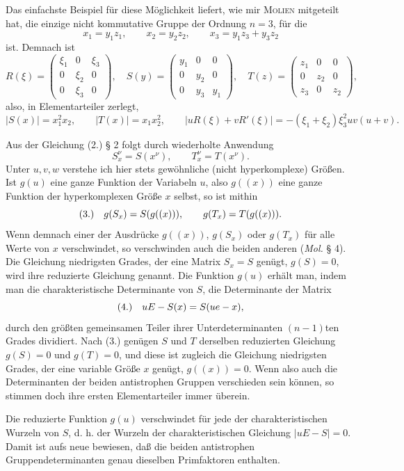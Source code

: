 \documentclass[11pt]{article}
\newcommand{\fnum}[1]{\textup{(\ensuremath{#1}.)}\quad}
\begin{document}
Das einfachste Beispiel für diese Möglichkeit liefert, wie mir \textsc{Molien} mitgeteilt hat, die einzige nicht kommutative Gruppe der Ordnung $n=3$, für die
\[
 x_1=y_1z_1,\qquad x_2=y_2z_2,\qquad x_3=y_1z_3+y_3z_2
\]
ist. Demnach ist
\[
 R(\xi)=
 \begin{pmatrix}\xi_1&0&\xi_3\\0&\xi_2&0\\0&\xi_3&0\end{pmatrix},\quad
 S(y)=
 \begin{pmatrix}y_1&0&0\\0&y_2&0\\0&y_3&y_1\end{pmatrix},\quad
 T(z)=
 \begin{pmatrix}z_1&0&0\\0&z_2&0\\z_3&0&z_2\end{pmatrix},
\]
also, in Elementarteiler zerlegt,
\[
 |S(x)|=x_1^2x_2,\qquad |T(x)|=x_1x_2^2,\qquad
 |uR(\xi)+vR'(\xi)|=-(\xi_1+\xi_2)\xi_3^2uv(u+v).
\]

Aus der Gleichung (2.) § 2 folgt durch wiederholte Anwendung
\[
 S_x^\nu=S(x^\nu),\qquad T_x^\nu=T(x^\nu).
\]
Unter $u,v,w$ verstehe ich hier stets gewöhnliche (nicht hyperkomplexe) Größen. Ist $g(u)$ eine ganze Funktion der Variabeln $u$, also $g((x))$ eine ganze Funktion der hyperkomplexen Größe $x$ selbst, so ist mithin
\[
\fnum{3} g(S_x)=S(g((x))),\qquad g(T_x)=T(g((x))).
\]
Wenn demnach einer der Ausdrücke $g((x))$, $g(S_x)$ oder $g(T_x)$ für alle Werte von $x$ verschwindet, so verschwinden auch die beiden anderen (\emph{Mol.} § 4). Die Gleichung niedrigsten Grades, der eine Matrix $S_x=S$ genügt, $g(S)=0$, wird ihre reduzierte Gleichung genannt. Die Funktion $g(u)$ erhält man, indem man die charakteristische Determinante von $S$, die Determinante der Matrix
\[
\fnum{4} uE-S(x)=S(ue-x),
\]
durch den größten gemeinsamen Teiler ihrer Unterdeterminanten $(n-1)$ten Grades dividiert. Nach (3.) genügen $S$ und $T$ derselben reduzierten Gleichung $g(S)=0$ und $g(T)=0$, und diese ist zugleich die Gleichung niedrigsten Grades, der eine variable Größe $x$ genügt, $g((x))=0$. Wenn also auch die Determinanten der beiden antistrophen Gruppen verschieden sein können, so stimmen doch ihre ersten Elementarteiler immer überein.

Die reduzierte Funktion $g(u)$ verschwindet für jede der charakteristischen Wurzeln von $S$, d. h. der Wurzeln der charakteristischen Gleichung $|uE-S|=0$. Damit ist aufs neue bewiesen, daß die beiden antistrophen Gruppendeterminanten genau dieselben Primfaktoren enthalten.
\end{document}
